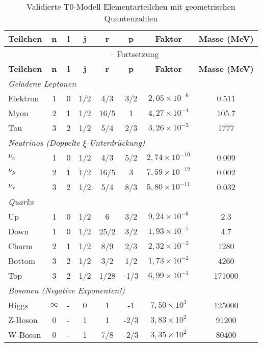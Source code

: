 \documentclass[12pt,a4paper]{article}
\theoremstyle{definition}
\begin{document}
	\begin{longtable}{lccccccc}
		\caption{Validierte T0-Modell Elementarteilchen mit geometrischen Quantenzahlen} \\
		\toprule
		\textbf{Teilchen} & \textbf{n} & \textbf{l} & \textbf{j} & \textbf{r} & \textbf{p} & \textbf{Faktor} & \textbf{Masse (MeV)} \\
		\midrule
		\endfirsthead
		\multicolumn{8}{c}{\tablename\ \thetable{} -- Fortsetzung} \\
		\toprule
		\textbf{Teilchen} & \textbf{n} & \textbf{l} & \textbf{j} & \textbf{r} & \textbf{p} & \textbf{Faktor} & \textbf{Masse (MeV)} \\
		\midrule
		\endhead
		\multicolumn{8}{l}{\emph{Geladene Leptonen}} \\
		Elektron & 1 & 0 & 1/2 & 4/3 & 3/2 & $2{,}05 \times 10^{-6}$ & 0.511 \\
		Myon & 2 & 1 & 1/2 & 16/5 & 1 & $4{,}27 \times 10^{-4}$ & 105.7 \\
		Tau & 3 & 2 & 1/2 & 5/4 & 2/3 & $3{,}26 \times 10^{-3}$ & 1777 \\
		\midrule
		\multicolumn{8}{l}{\emph{Neutrinos (Doppelte $\xi$-Unterdrückung)}} \\
		$\nu_e$ & 1 & 0 & 1/2 & 4/3 & 5/2 & $2{,}74 \times 10^{-10}$ & 0.009 \\
		$\nu_\mu$ & 2 & 1 & 1/2 & 16/5 & 3 & $7{,}59 \times 10^{-12}$ & 0.002 \\
		$\nu_\tau$ & 3 & 2 & 1/2 & 5/4 & 8/3 & $5{,}80 \times 10^{-11}$ & 0.032 \\
		\midrule
		\multicolumn{8}{l}{\emph{Quarks}} \\
		Up & 1 & 0 & 1/2 & 6 & 3/2 & $9{,}24 \times 10^{-6}$ & 2.3 \\
		Down & 1 & 0 & 1/2 & 25/2 & 3/2 & $1{,}93 \times 10^{-5}$ & 4.7 \\
		Charm & 2 & 1 & 1/2 & 8/9 & 2/3 & $2{,}32 \times 10^{-3}$ & 1280 \\
		Bottom & 3 & 2 & 1/2 & 3/2 & 1/2 & $1{,}73 \times 10^{-2}$ & 4260 \\
		Top & 3 & 2 & 1/2 & 1/28 & -1/3 & $6{,}99 \times 10^{-1}$ & 171000 \\
		\midrule
		\multicolumn{8}{l}{\emph{Bosonen (Negative Exponenten!)}} \\
		Higgs & $\infty$ & - & 0 & 1 & -1 & $7{,}50 \times 10^{3}$ & 125000 \\
		Z-Boson & 0 & - & 1 & 1 & -2/3 & $3{,}83 \times 10^{2}$ & 91200 \\
		W-Boson & 0 & - & 1 & 7/8 & -2/3 & $3{,}35 \times 10^{2}$ & 80400 \\
		\bottomrule
	\end{longtable}
	
\end{document}
